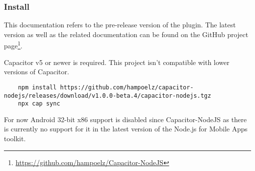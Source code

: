 \subsubsection{Install}
\label{sec:Capacitor-NodeJS:Install}

This documentation refers to the pre-release version  of the plugin.
The latest version as well as the related documentation can be found on the GitHub project page\footnote{\url{https://github.com/hampoelz/Capacitor-NodeJS}}.

Capacitor v5 or newer is required. This project isn't compatible with lower versions of Capacitor.

\begin{verbatim}
    npm install https://github.com/hampoelz/capacitor-nodejs/releases/download/v1.0.0-beta.4/capacitor-nodejs.tgz
    npx cap sync
\end{verbatim}

\begin{note}[Note]
    For now Android 32-bit x86 support is disabled since Capacitor-NodeJS  as there is currently no support for it in the latest version of the Node.js for Mobile Apps toolkit.
    \cite{nodejs-mobile}
\end{note}